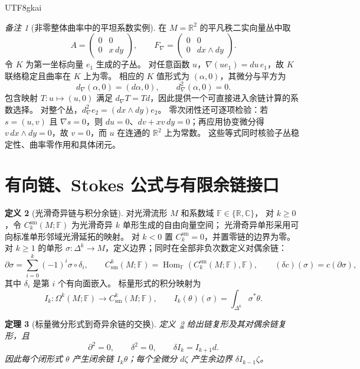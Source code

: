 \documentclass[12pt,a4paper,openany,notitlepage]{report}
\theoremstyle{plain}
\newtheorem{theorem}{定理}[chapter]
\theoremstyle{definition}
\newtheorem{definition}[theorem]{定义}
\theoremstyle{remark}
\newtheorem{remark}[theorem]{备注}
\begin{document}
\begin{CJK*}{UTF8}{gkai}
\begin{remark}[非零整体曲率中的平坦系数实例]
在 $M=\mathbb R^2$ 的平凡秩二实向量丛中取
\[
A=\begin{pmatrix}0&0\\0&x\,dy\end{pmatrix},
\qquad
F_\nabla=\begin{pmatrix}0&0\\0&dx\wedge dy\end{pmatrix}.
\]
令 $K$ 为第一坐标向量 $e_1$ 生成的子丛。
对任意函数 $u$，$\nabla(u e_1)=du\,e_1$，故 $K$ 联络稳定且曲率在 $K$ 上为零。
相应的 $K$ 值形式为 $(\alpha,0)$，其微分与平方为
\[
d_\nabla(\alpha,0)=(d\alpha,0),\qquad
 d_\nabla^2(\alpha,0)=0.
\]
包含映射 $T:u\mapsto(u,0)$ 满足 $d_\nabla T=T d$，因此提供一个可直接进入余链计算的系数选择。
对整个丛，$d_\nabla^2e_2=(dx\wedge dy)e_2$。
零次闭性还可逐项检验：若 $s=(u,v)$ 且 $\nabla s=0$，则
$du=0$、$dv+xv\,dy=0$；再应用协变微分得
$v\,dx\wedge dy=0$，故 $v=0$，而 $u$ 在连通的 $\mathbb R^2$ 上为常数。
这些等式同时核验子丛稳定性、曲率零作用和具体闭元。
\end{remark}

\section{有向链、Stokes 公式与有限余链接口}
\label{exp:geo:section:stokes}

\begin{definition}[光滑奇异链与积分余链]
\label{hgov:geo:def:singular}
对光滑流形 $M$ 和系数域 $\mathbb F\in\{\mathbb R,\mathbb C\}$，
对 $k\ge0$，令 $C_k^{\mathrm{sm}}(M;\mathbb F)$ 为光滑奇异 $k$ 单形生成的自由向量空间；
光滑奇异单形采用可向标准单形邻域光滑延拓的映射。
对 $k<0$ 置 $C_k^{\mathrm{sm}}=0$，并置零链的边界为零。
对 $k\ge1$ 的单形 $\sigma:\Delta^k\to M$，定义边界；同时在全部非负次数定义对偶余链：
\[
\partial\sigma=\sum_{i=0}^k(-1)^i\sigma\circ\delta_i,
\qquad
C_{\mathrm{sm}}^k(M;\mathbb F)
=\operatorname{Hom}_{\mathbb F}(C_k^{\mathrm{sm}}(M;\mathbb F),\mathbb F),
\qquad
(\delta c)(\sigma)=c(\partial\sigma),
\]
其中 $\delta_i$ 是第 $i$ 个有向面嵌入。
标量形式的积分映射为
\[
I_k:\Omega^k(M;\mathbb F)\longrightarrow C_{\mathrm{sm}}^k(M;\mathbb F),
\qquad I_k(\theta)(\sigma)=\int_{\Delta^k}\sigma^*\theta.
\]
\end{definition}

\begin{theorem}[标量微分形式到奇异余链的交换]
\label{hgov:geo:thm:integration}
定义~\ref{hgov:geo:def:singular} 给出链复形及其对偶余链复形，且
\[
\partial^2=0,\qquad\delta^2=0,\qquad
\delta I_k=I_{k+1}d.
\]
因此每个闭形式 $\theta$ 产生闭余链 $I_k\theta$；每个全微分 $d\zeta$ 产生余边界 $\delta I_{k-1}\zeta$\cite{ExtBottTu,ExtHatcher}。
\end{theorem}


\end{CJK*}
\end{document}
